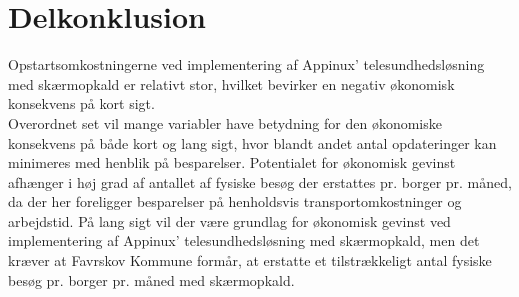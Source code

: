 \section{Delkonklusion}
Opstartsomkostningerne ved implementering af Appinux' telesundhedsløsning med skærmopkald er relativt stor, hvilket bevirker en negativ økonomisk konsekvens på kort sigt.\\
Overordnet set vil mange variabler have betydning for den økonomiske konsekvens på både kort og lang sigt, hvor blandt andet antal opdateringer kan minimeres med henblik på besparelser. 
Potentialet for økonomisk gevinst afhænger i høj grad af antallet af fysiske besøg der erstattes pr. borger pr. måned, da der her foreligger besparelser på henholdsvis transportomkostninger og arbejdstid.
På lang sigt vil der være grundlag for økonomisk gevinst ved implementering af Appinux’ telesundhedsløsning med skærmopkald, men det kræver at Favrskov Kommune formår, at erstatte et tilstrækkeligt antal fysiske besøg pr. borger pr. måned med skærmopkald.